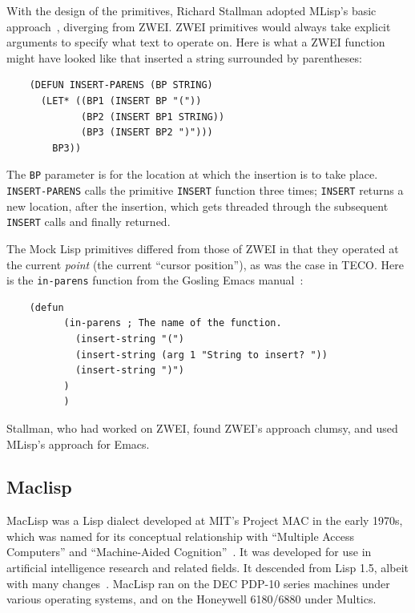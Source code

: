 \documentclass[format=acmsmall, review]{acmart}
\begin{document}
With the design of the primitives, Richard Stallman adopted MLisp's
basic approach~\cite{Stallman2018-personal}, diverging from ZWEI.
ZWEI primitives would always take explicit arguments to specify what
text to operate on.  Here is what a ZWEI function might have looked
like that inserted a string surrounded by parentheses:
%
\begin{verbatim}
    (DEFUN INSERT-PARENS (BP STRING)
      (LET* ((BP1 (INSERT BP "("))
             (BP2 (INSERT BP1 STRING))
             (BP3 (INSERT BP2 ")")))
        BP3))
\end{verbatim}
%
The \texttt{BP} parameter is for the location at which the insertion
is to take place.  \texttt{INSERT-PARENS} calls the primitive
\texttt{INSERT} function three times; \texttt{INSERT} returns a new
location, after the insertion, which gets threaded through the
subsequent \texttt{INSERT} calls and finally returned.

The Mock Lisp primitives differed from those of ZWEI in that they operated
at the current \emph{point} (the current ``cursor position''), as was the
case in TECO.  Here is the \texttt{in-parens} function from the Gosling
Emacs manual~\cite{Gosling1981}:
%
\begin{verbatim}
    (defun
          (in-parens ; The name of the function.
            (insert-string "(")
            (insert-string (arg 1 "String to insert? "))
            (insert-string ")")
          )
          )
\end{verbatim}
%
Stallman, who had worked on ZWEI, found ZWEI's approach clumsy, and
used MLisp's approach for Emacs.

\subsection{Maclisp}

MacLisp was a Lisp dialect developed at MIT's Project MAC in the early
1970s, which was named for its conceptual relationship with ``Multiple
Access Computers'' and ``Machine-Aided Cognition''~\cite{Pitman1983}.
It was developed for use in artificial intelligence research and
related fields.  It descended from Lisp 1.5, albeit with many changes~\cite{Moon1974}.
MacLisp ran on the DEC PDP-10 series machines under various operating
systems, and on the Honeywell 6180/6880 under Multics.
\end{document}
